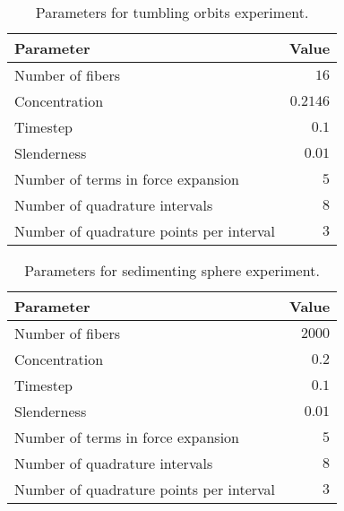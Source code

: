 \begin{table}[!htbp]
  \caption*{Parameters for tumbling orbits experiment.}
  \begin{center}
    \begin{tabulary}{\textwidth}{LR}
      \toprule
      Parameter & Value \\
      \midrule
      Number of fibers & $16$ \\
      Concentration & $0.2146$ \\
      Timestep & $0.1$ \\
      Slenderness & $0.01$ \\
      Number of terms in force expansion & $5$ \\
      Number of quadrature intervals & $8$ \\
      Number of quadrature points per interval & $3$ \\
      \bottomrule
    \end{tabulary}
  \end{center}
\end{table}

\begin{table}[!htbp]
  \caption*{Parameters for sedimenting sphere experiment.}
  \begin{center}
    \begin{tabulary}{\textwidth}{LR}
      \toprule
      Parameter & Value \\
      \midrule
      Number of fibers & $2000$ \\
      Concentration & $0.2$ \\
      Timestep & $0.1$ \\
      Slenderness & $0.01$ \\
      Number of terms in force expansion & $5$ \\
      Number of quadrature intervals & $8$ \\
      Number of quadrature points per interval & $3$ \\
      \bottomrule
    \end{tabulary}
  \end{center}
\end{table}
